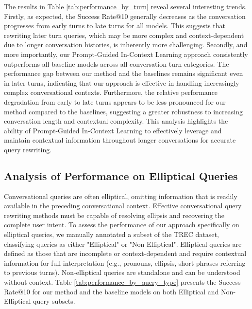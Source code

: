 The results in Table \ref{tab:performance_by_turn} reveal several interesting trends.  Firstly, as expected, the Success Rate@10 generally decreases as the conversation progresses from early turns to late turns for all models. This suggests that rewriting later turn queries, which may be more complex and context-dependent due to longer conversation histories, is inherently more challenging.  Secondly, and more importantly, our Prompt-Guided In-Context Learning approach consistently outperforms all baseline models across all conversation turn categories.  The performance gap between our method and the baselines remains significant even in later turns, indicating that our approach is effective in handling increasingly complex conversational contexts.  Furthermore, the relative performance degradation from early to late turns appears to be less pronounced for our method compared to the baselines, suggesting a greater robustness to increasing conversation length and contextual complexity.  This analysis highlights the ability of Prompt-Guided In-Context Learning to effectively leverage and maintain contextual information throughout longer conversations for accurate query rewriting.


\subsection{Analysis of Performance on Elliptical Queries}

Conversational queries are often elliptical, omitting information that is readily available in the preceding conversational context.  Effective conversational query rewriting methods must be capable of resolving ellipsis and recovering the complete user intent.  To assess the performance of our approach specifically on elliptical queries, we manually annotated a subset of the TREC dataset, classifying queries as either "Elliptical" or "Non-Elliptical".  Elliptical queries are defined as those that are incomplete or context-dependent and require contextual information for full interpretation (e.g., pronouns, ellipsis, short phrases referring to previous turns). Non-elliptical queries are standalone and can be understood without context. Table \ref{tab:performance_by_query_type} presents the Success Rate@10 for our method and the baseline models on both Elliptical and Non-Elliptical query subsets.



